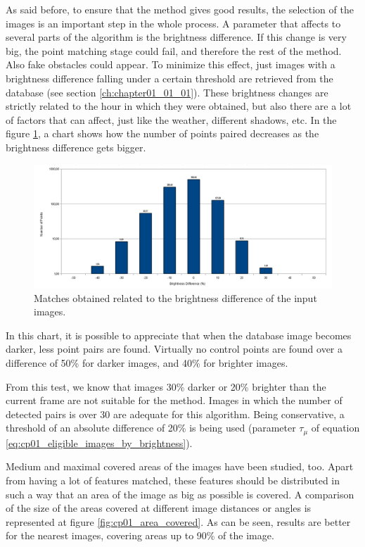 As said before, to ensure that the method gives good results, the selection of the images is an important step in the whole process. A parameter that affects to several parts of the algorithm is the brightness difference. If this change is very big, the point matching stage could fail, and therefore the rest of the method. Also fake obstacles could appear. To minimize this effect, just images with a brightness difference falling under a certain threshold are retrieved from the database (see section \ref{ch:chapter01_01_01}). These brightness changes are strictly related to the hour in which they were obtained, but also there are a lot of factors that can affect, just like the weather, different shadows, etc. In the figure \ref{fig:cp01_brightness_vs_matches}, a chart shows how the number of points paired decreases as the brightness difference gets bigger.

\begin{figure}[t]
\centering
\includegraphics[width=\textwidth]{brightness_vs_matches}
\caption{Matches obtained related to the brightness difference of the input images.}\label{fig:cp01_brightness_vs_matches}
\end{figure}

In this chart, it is possible to appreciate that when the database image becomes darker, less point pairs are found. Virtually no control points are found over a difference of 50\% for darker images, and 40\% for brighter images.

From this test, we know that images 30\% darker or 20\% brighter than the current frame are not suitable for the method. Images in which the number of detected pairs is over 30 are adequate for this algorithm. Being conservative, a threshold of an absolute difference of 20\% is being used (parameter $\tau_{\mu}$ of equation \ref{eq:cp01_eligible_images_by_brightness}).

Medium and maximal covered areas of the images have been studied, too. Apart from having a lot of features matched, these features should be distributed in such a way that an area of the image as big as possible is covered. A comparison of the size of the areas covered at different image distances or angles is represented at figure \ref{fig:cp01_area_covered}. As can be seen, results are better for the nearest images, covering areas up to 90\% of the image.


